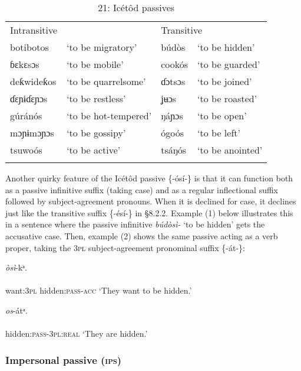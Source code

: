 \begin{table}
\caption{21: Icétôd passives}
\label{tab:8}


\begin{tabularx}{\textwidth}{XXXX}
\lsptoprule

Intransitive &  & \multicolumn{2}{X}{Transitive}\\
botibotos & ‘to be migratory’ & búdòs & ‘to be hidden’\\
ɓɛkɛsɔs & ‘to be mobile’ & cookós & ‘to be guarded’\\
deƙwideƙos & ‘to be quarrelsome’ & ɗɔtsɔs & ‘to be joined’\\
ɗɛɲɨɗɛɲɔs & ‘to be restless’ & ʝʉɔs & ‘to be roasted’\\
gúránós & ‘to be hot-tempered’ & ŋáɲɔs & ‘to be open’\\
mɔɲɨmɔɲɔs & ‘to be gossipy’ & ógoós & ‘to be left’\\
tsuwoós & ‘to be active’ & tsáŋós & ‘to be anointed’\\
\lspbottomrule
\end{tabularx}
\end{table}
Another quirky feature of the Icétôd passive \{-ósí-\} is that it can function both as a passive infinitive suffix (taking case) and as a regular inflectional suffix followed by subject-agreement pronouns. When it is declined for case, it declines just like the transitive suffix \{-ésí-\} in §8.2.2. Example (1) below illustrates this in a sentence where the passive infinitive \textit{búdòsì-} ‘to be hidden’ gets the accusative case. Then, example (2) shows the same passive acting as a verb proper, taking the 3\textsc{pl} subject-agreement pronominal suffix \{-át-\}:




\ea\label{ex:}
\textit{òsì}{}-kᵃ. \\
    \\
want:\textsc{3pl}   hidden:\textsc{pass-acc}
\glt ‘They want to be hidden.’ 
\z




\ea\label{ex:}
\textit{os}{}-átᵃ. \\
    \\
hidden:\textsc{pass}{}-\textsc{3pl:real}
\glt ‘They are hidden.’ 
\z




\subsubsection{Impersonal passive (\textsc{ips})}

